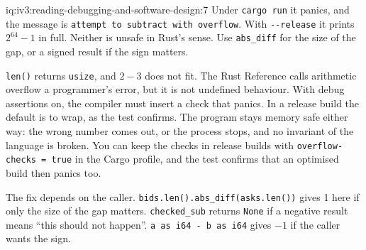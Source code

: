 \begin{solution}{iq:iv3:reading-debugging-and-software-design:7}
Under \texttt{cargo run} it panics, and the message is \texttt{attempt to subtract with overflow}. With \texttt{-{}-release} it prints $2^{64} - 1$ in full. Neither is unsafe in Rust's sense. Use \texttt{abs\_diff} for the size of the gap, or a signed result if the sign matters.

\texttt{len()} returns \texttt{usize}, and $2 - 3$ does not fit. The Rust Reference calls arithmetic overflow a programmer's error, but it is not undefined behaviour. With debug assertions on, the compiler must insert a check that panics. In a release build the default is to wrap, as the test confirms. The program stays memory safe either way: the wrong number comes out, or the process stops, and no invariant of the language is broken. You can keep the checks in release builds with \texttt{overflow-checks = true} in the Cargo profile, and the test confirms that an optimised build then panics too.

The fix depends on the caller. \texttt{bids.len().abs\_diff(asks.len())} gives 1 here if only the size of the gap matters. \texttt{checked\_sub} returns \texttt{None} if a negative result means ``this should not happen''. \texttt{a as i64 - b as i64} gives $-1$ if the caller wants the sign.


\end{solution}

